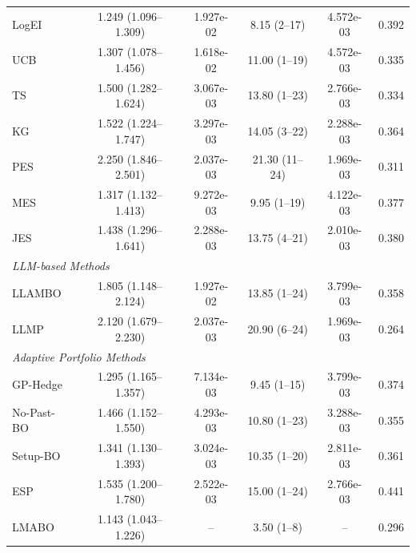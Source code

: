\begin{table}
\begin{tabular}{@{}lccccc@{}}
LogEI & 1.249 (1.096--1.309) & 1.927e-02 & 8.15 (2--17) & 4.572e-03 & 0.392 \\
UCB & 1.307 (1.078--1.456) & 1.618e-02 & 11.00 (1--19) & 4.572e-03 & 0.335 \\
TS & 1.500 (1.282--1.624) & 3.067e-03 & 13.80 (1--23) & 2.766e-03 & 0.334 \\
KG & 1.522 (1.224--1.747) & 3.297e-03 & 14.05 (3--22) & 2.288e-03 & 0.364 \\
PES & 2.250 (1.846--2.501) & 2.037e-03 & 21.30 (11--24) & 1.969e-03 & 0.311 \\
MES & 1.317 (1.132--1.413) & 9.272e-03 & 9.95 (1--19) & 4.122e-03 & 0.377 \\
JES & 1.438 (1.296--1.641) & 2.288e-03 & 13.75 (4--21) & 2.010e-03 & 0.380 \\
\multicolumn{5}{l}{\textit{LLM-based Methods}} \\
LLAMBO & 1.805 (1.148--2.124) & 1.927e-02 & 13.85 (1--24) & 3.799e-03 & 0.358 \\
LLMP & 2.120 (1.679--2.230) & 2.037e-03 & 20.90 (6--24) & 1.969e-03 & 0.264 \\
\multicolumn{5}{l}{\textit{Adaptive Portfolio Methods}} \\
GP-Hedge & 1.295 (1.165--1.357) & 7.134e-03 & 9.45 (1--15) & 3.799e-03 & 0.374 \\
No-Past-BO & 1.466 (1.152--1.550) & 4.293e-03 & 10.80 (1--23) & 3.288e-03 & 0.355 \\
Setup-BO & 1.341 (1.130--1.393) & 3.024e-03 & 10.35 (1--20) & 2.811e-03 & 0.361 \\
ESP & 1.535 (1.200--1.780) & 2.522e-03 & 15.00 (1--24) & 2.766e-03 & 0.441 \\
\midrule
LMABO & 1.143 (1.043--1.226) & -- & 3.50 (1--8) & -- & 0.296 \\
\bottomrule
    \end{tabular}
    \end{table}
    